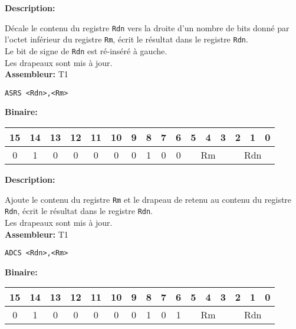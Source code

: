 
\textbf{Description: }

Décale le contenu du registre \texttt{Rdn} vers la droite d'un nombre de bits donné par l'octet inférieur du registre \texttt{Rm}, écrit le résultat dans le registre \texttt{Rdn}.\\
Le bit de signe de \texttt{Rdn} est ré-inséré à gauche.\\
Les drapeaux sont mis à jour.\\

\textbf{Assembleur:} T1

\begin{lstlisting}
ASRS <Rdn>,<Rm>
\end{lstlisting}

\textbf{Binaire:}\\

\begin{tabular}{| c c c c c c c c c c c c c c c c |}
\hline
15 & 14 & 13 & 12 & 11 & 10 & \multicolumn{1}{|c}{9} & 8 & 7 & 6 & \multicolumn{1}{|c}{5} & 4 & 3 & \multicolumn{1}{|c}{2} & 1 & 0 \\
\hline
0 & 1 & 0 & 0 & 0 & 0 & \multicolumn{1}{|c}{0} & 1 & 0 & 0 & \multicolumn{3}{|c}{Rm} & \multicolumn{3}{|c|}{Rdn} \\
\hline
\end{tabular}



\textbf{Description: }

Ajoute le contenu du registre \texttt{Rm} et le drapeau de retenu au contenu du registre \texttt{Rdn}, écrit le résultat dans le registre \texttt{Rdn}.\\
Les drapeaux sont mis à jour.\\

\textbf{Assembleur:} T1

\begin{lstlisting}
ADCS <Rdn>,<Rm>
\end{lstlisting}

\textbf{Binaire:}\\

\begin{tabular}{| c c c c c c c c c c c c c c c c |}
\hline
15 & 14 & 13 & 12 & 11 & 10 & \multicolumn{1}{|c}{9} & 8 & 7 & 6 & \multicolumn{1}{|c}{5} & 4 & 3 & \multicolumn{1}{|c}{2} & 1 & 0 \\
\hline
0 & 1 & 0 & 0 & 0 & 0 & \multicolumn{1}{|c}{0} & 1 & 0 & 1 & \multicolumn{3}{|c}{Rm} & \multicolumn{3}{|c|}{Rdn} \\
\hline
\end{tabular}

